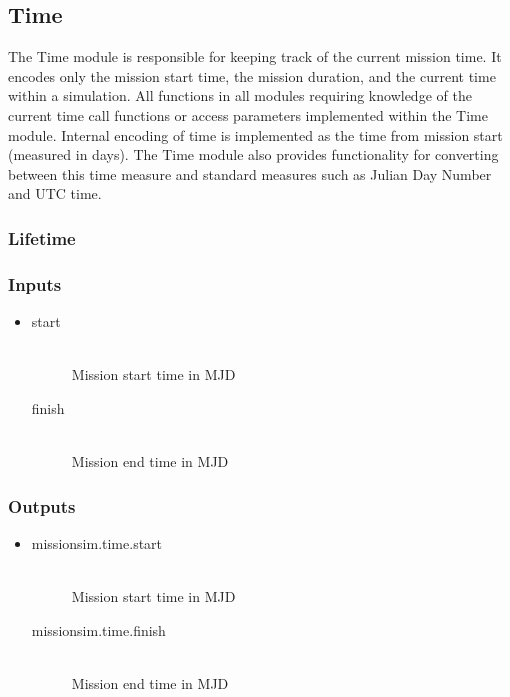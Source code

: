 \documentclass[]{asme2ej}
\begin{document}
\subsection{Time}
The Time module is responsible for keeping track of the current mission time.  It encodes only the mission start time, the mission duration, and the current time within a simulation.  All functions in all modules requiring knowledge of the current time call functions or access parameters implemented within the Time module.  Internal encoding of time is implemented as the time from mission start (measured in days).  The Time module also provides functionality for converting between this time measure and standard measures such as Julian Day Number and UTC time.

\subsubsection{Lifetime}

\subsubsection*{Inputs}
\begin{itemize}
    \item
    \begin{description}
        \item[start] \hfill \\
        Mission start time in MJD
        \item[finish] \hfill \\
        Mission end time in MJD
    \end{description}
\end{itemize}

\subsubsection*{Outputs}
\begin{itemize}
    \item
    \begin{description}
        \item[missionsim.time.start] \hfill \\
        Mission start time in MJD
        \item[missionsim.time.finish] \hfill \\
        Mission end time in MJD
    \end{description}
\end{itemize}
\end{document}

